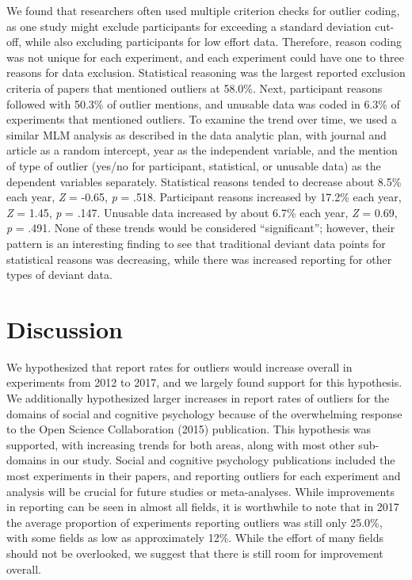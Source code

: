 \documentclass[english,,man,mask]{apa6}
\theoremstyle{definition}
\theoremstyle{definition}
\theoremstyle{definition}
\theoremstyle{remark}
\begin{document}
We found that researchers often used multiple criterion checks for
outlier coding, as one study might exclude participants for exceeding a
standard deviation cut-off, while also excluding participants for low
effort data. Therefore, reason coding was not unique for each
experiment, and each experiment could have one to three reasons for data
exclusion. Statistical reasoning was the largest reported exclusion
criteria of papers that mentioned outliers at 58.0\%. Next, participant
reasons followed with 50.3\% of outlier mentions, and unusable data was
coded in 6.3\% of experiments that mentioned outliers. To examine the
trend over time, we used a similar MLM analysis as described in the data
analytic plan, with journal and article as a random intercept, year as
the independent variable, and the mention of type of outlier (yes/no for
participant, statistical, or unusable data) as the dependent variables
separately. Statistical reasons tended to decrease about 8.5\% each
year, \emph{Z} = -0.65, \emph{p} = .518. Participant reasons increased
by 17.2\% each year, \emph{Z} = 1.45, \emph{p} = .147. Unusable data
increased by about 6.7\% each year, \emph{Z} = 0.69, \emph{p} = .491.
None of these trends would be considered \enquote{significant}; however,
their pattern is an interesting finding to see that traditional deviant
data points for statistical reasons was decreasing, while there was
increased reporting for other types of deviant data.

\section{Discussion}\label{discussion}

We hypothesized that report rates for outliers would increase overall in
experiments from 2012 to 2017, and we largely found support for this
hypothesis. We additionally hypothesized larger increases in report
rates of outliers for the domains of social and cognitive psychology
because of the overwhelming response to the Open Science Collaboration
(2015) publication. This hypothesis was supported, with increasing
trends for both areas, along with most other sub-domains in our study.
Social and cognitive psychology publications included the most
experiments in their papers, and reporting outliers for each experiment
and analysis will be crucial for future studies or meta-analyses. While
improvements in reporting can be seen in almost all fields, it is
worthwhile to note that in 2017 the average proportion of experiments
reporting outliers was still only 25.0\%, with some fields as low as
approximately 12\%. While the effort of many fields should not be
overlooked, we suggest that there is still room for improvement overall.
\end{document}

